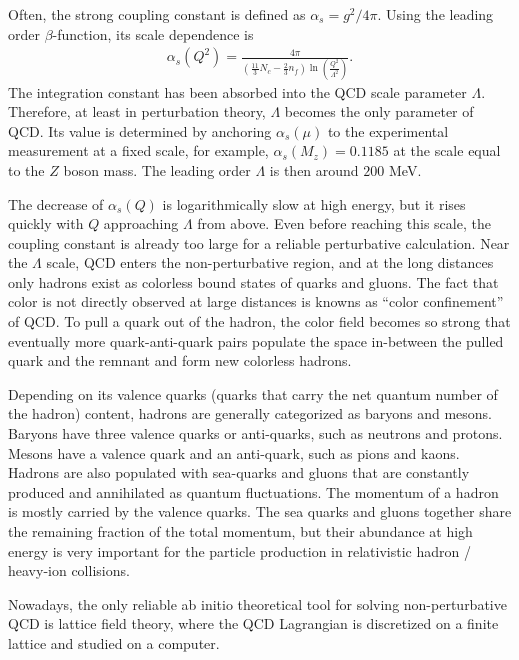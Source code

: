 Often, the strong coupling constant is defined as $\alpha_s = g^2/4\pi$.
Using the leading order $\beta$-function, its scale dependence is
\begin{eqnarray}
    \alpha_s(Q^2) = \frac{4\pi}{\left(\frac{11}{3}N_c - \frac{2}{3}n_f\right)\ln\left(\frac{Q^2}{\Lambda^2}\right)}.
\end{eqnarray}
The integration constant has been absorbed into the QCD scale parameter $\Lambda$.
Therefore, at least in perturbation theory, $\Lambda$ becomes the only parameter of QCD. 
Its value is determined by anchoring $\alpha_s(\mu)$ to the experimental measurement at a fixed scale, for example, $\alpha_s(M_z) = 0.1185$ at the scale equal to the $Z$ boson mass.
The leading order $\Lambda$ is then around $200$ MeV.

The decrease of $\alpha_s(Q)$ is logarithmically slow at high energy, but it rises quickly with $Q$ approaching $\Lambda$ from above.
Even before reaching this scale, the coupling constant is already too large for a reliable perturbative calculation.
Near the $\Lambda$ scale, QCD enters the non-perturbative region,
and at the long distances only hadrons exist as colorless bound states of quarks and gluons.
The fact that color is not directly observed at large distances is knowns as ``color confinement'' of QCD. 
To pull a quark out of the hadron, the color field becomes so strong that eventually more quark-anti-quark pairs populate the space in-between the pulled quark and the remnant and form new colorless hadrons.

Depending on its valence quarks (quarks that carry the net quantum number of the hadron) content, hadrons are generally categorized as baryons and mesons.
Baryons have three valence quarks or anti-quarks, such as neutrons and protons.
Mesons have a valence quark and an anti-quark, such as pions and kaons.
Hadrons are also populated with sea-quarks and gluons that are constantly produced and annihilated as quantum fluctuations.
The momentum of a hadron is mostly carried by the valence quarks.
The sea quarks and gluons together share the remaining fraction of the total momentum, but their abundance at high energy is very important for the particle production in relativistic hadron / heavy-ion collisions.

Nowadays, the only reliable ab initio theoretical tool for solving non-perturbative QCD is lattice field theory, where the QCD Lagrangian is discretized on a finite lattice and studied on a computer.

